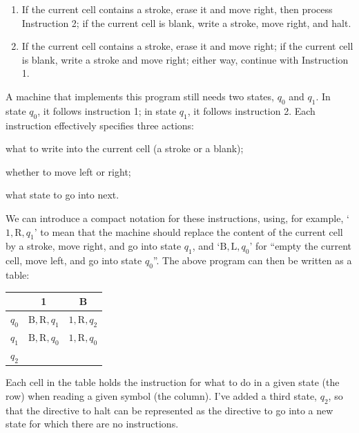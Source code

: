 \begin{enumerate}[itemsep=2pt,parsep=0pt,topsep=6pt,partopsep=2pt, labelwidth=6em,leftmargin=6.5em]
  \item[\emph{Instruction 1}.] If the current cell contains a stroke, erase it and move right, then process Instruction 2;
        if the current cell is blank, write a stroke, move right, and halt.
  \item[\emph{Instruction 2}.] If the current cell contains a stroke, erase it and move right;
        if the current cell is blank, write a stroke and move right;
        either way, continue with Instruction 1.
\end{enumerate}

A machine that implements this program
still needs two states,
$q_{0}$ and $q_{1}$.
In state $q_{0}$,
it follows instruction 1;
in state $q_{1}$,
it follows instruction 2.
Each instruction effectively specifies three actions:
\begin{itemize*}
  \item what to write into the current cell (a stroke or a blank);
  \item whether to move left or right;
  \item what state to go into next.
\end{itemize*}

We can introduce a compact notation for these instructions,
using, for example,
`$1,\mathrm{R},q_1$' to mean that
the machine should replace the content of the current cell by a stroke,
move right,
and go into state $q_{1}$,
and `$\mathrm{B},\mathrm{L},q_0$' for
``empty the current cell, move left, and go into state $q_0$''.
The above program can then be written as a table:

\begin{center}
  \begin{tabular}{c | c c}
    \cellcolor{gray!20} & \cellcolor{gray!20} 1 & \cellcolor{gray!20} B \\
    \hline
    \cellcolor{gray!20} $q_0$ & $\mathrm{B}, \mathrm{R}, q_1$ & $1, \mathrm{R}, q_2$ \\
    \cellcolor{gray!20} $q_1$ & $\mathrm{B}, \mathrm{R}, q_0$ & $1, \mathrm{R}, q_0$ \\
    \cellcolor{gray!20} $q_2$ &  & \\
  \end{tabular}
\end{center}

\noindent%
Each cell in the table holds the instruction for what to do
in a given state (the row) when reading a given symbol (the column).
I've added a third state, $q_{2}$,
so that the directive to halt can be represented as the directive
to go into a new state
for which there are no instructions.

